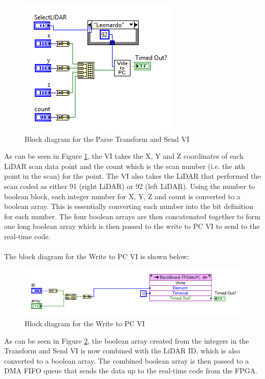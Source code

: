 \newpage

\begin{figure}[h!]
\centering
\includegraphics[scale=0.75]{Photos/inttobool.png}
\caption{Block diagram for the Parse Transform and Send VI}
\label{fig:inttobool}
\end{figure}

\noindent As can be seen in Figure \ref{fig:inttobool}, the VI takes the X, Y and Z coordinates of each LiDAR scan data point and the count which is the scan number (i.e. the nth point in the scan) for the point. The VI also takes the LiDAR that performed the scan coded as either 91 (right LiDAR) or 92 (left LiDAR). Using the number to boolean block, each integer number for X, Y, Z and count is converted to a boolean array. This is essentially converting each number into the bit definition for each number. The four boolean arrays are then concatenated together to form one long boolean array which is then passed to the write to PC VI to send to the real-time code.\\ \\
%
The block diagram for the Write to PC VI is shown below:

\begin{figure}[h!]
\centering
\includegraphics[scale=0.7]{Photos/sendtopc.png}
\caption{Block diagram for the Write to PC VI}
\label{fig:sendtopc}
\end{figure}

\noindent As can be seen in Figure \ref{fig:sendtopc}, the boolean array created from the integers in the Transform and Send VI is now combined with the LiDAR ID, which is also converted to a boolean array. The combined boolean array is then passed to a DMA FIFO queue that sends the data up to the real-time code from the FPGA.